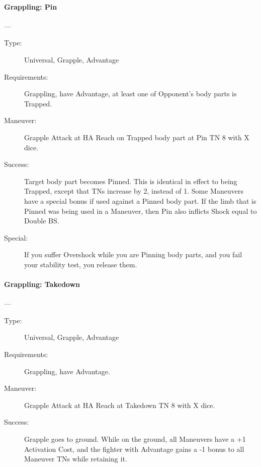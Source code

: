 \documentclass[oneside,11pt,english]{book}
\begin{document}
\paragraph{\large\label{man:Grappling: Pin}Grappling: Pin}---\quad{\large[X]}
\vspace{-10pt}\begin{description} 
\item [Type:] Universal, Grapple, Advantage 
\item [Requirements:] Grappling, have Advantage, at least one of Opponent's body parts is Trapped. 
\item [Maneuver:] Grapple Attack at HA Reach on Trapped body part at Pin TN 8 with X dice. 
\item [Success:] Target body part becomes Pinned. This is identical in effect to being Trapped, except that TNs 
increase by 2, instead of 1. Some Maneuvers have a special bonus if used against a Pinned body part. If 
the limb that is Pinned was being used in a Maneuver, then Pin also inflicts Shock equal to Double BS. 
\item [Special:] If you suffer Overshock while you are Pinning body parts, and you fail your stability test, you 
release them. 
\end{description}
\paragraph{\large\label{man:Grappling: Takedown}Grappling: Takedown}---\quad{\large[X]}
\vspace{-10pt}\begin{description} 
\item [Type:] Universal, Grapple, Advantage 
\item [Requirements:] Grappling, have Advantage. 
\item [Maneuver:] Grapple Attack at HA Reach at Takedown TN 8 with X dice. 
\item [Success:] Grapple goes to ground. While on the ground, all Maneuvers have a +1 Activation Cost, and the 
fighter with Advantage gains a -1 bonus to all Maneuver TNs while retaining it. 
\end{description}
\end{document}
